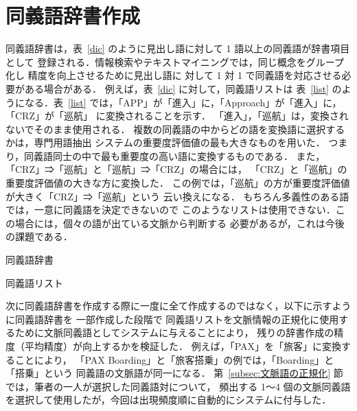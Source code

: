 \documentclass[japanese]{jnlp_1.4}
\begin{document}
\section{同義語辞書作成}

同義語辞書は，表~\ref{dic} のように見出し語に対して 1 語以上の同義語が辞書項目として
登録される．情報検索やテキストマイニングでは，同じ概念をグループ化し
精度を向上させるために見出し語に
対して 1 対 1 で同義語を対応させる必要がある場合がある．
例えば，表~\ref{dic} に対して，同義語リストは
表~\ref{list} のようになる．表~\ref{list} では，「APP」が「進入」に，「Approach」が「進入」に，
「CRZ」が「巡航」
に変換されることを示す．
「進入」，「巡航」は，変換されないでそのまま使用される．
複数の同義語の中からどの語を変換語に選択するかは，専門用語抽出
システムの重要度評価値の最も大きなものを用いた．
つまり，同義語同士の中で最も重要度の高い語に変換するものである．
また，「CRZ」⇒「巡航」と「巡航」⇒「CRZ」の場合には，
「CRZ」と「巡航」の重要度評価値の大きな方に変換した．
この例では，「巡航」の方が重要度評価値が大きく「CRZ」⇒「巡航」という
云い換えになる．
もちろん多義性のある語では，一意に同義語を決定できないので
このようなリストは使用できない．この場合には，個々の語が出ている文脈から判断する
必要があるが，これは今後の課題である．

\begin{table}[t]
\begin{minipage}{0.45\textwidth}
\begin{center}
\caption{同義語辞書}
\label{dic}

\end{center}
\end{minipage}
\hfill
\begin{minipage}{0.45\textwidth}
\begin{center}
\caption{同義語リスト}
\label{list}

\end{center}
\end{minipage}
\end{table}

次に同義語辞書を作成する際に一度に全て作成するのではなく，以下に示すように同義語辞書を
一部作成した段階で
同義語リストを文脈情報の正規化に使用するために文脈同義語としてシステムに与えることにより，
残りの辞書作成の精度（平均精度）が向上するかを検証した．
例えば，「PAX」を「旅客」に変換することにより，
「PAX Boarding」と「旅客搭乗」の例では，「Boarding」と「搭乗」という
同義語の文脈語が同一になる．
第~\ref{subsec:文脈語の正規化} 節では，筆者の一人が選択した同義語対について，
頻出する 1〜4 個の文脈同義語を選択して使用したが，今回は出現頻度順に自動的にシステムに付与した．
\end{document}

